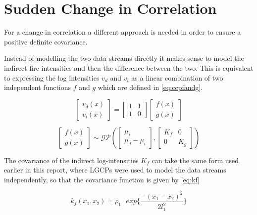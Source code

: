 \documentclass[a4paper,11pt]{report}
\begin{document}
\section{Sudden Change in Correlation}

For a change in correlation a different approach is needed in order to ensure a positive definite covariance.  

Instead of modelling the two data streams directly it makes sense to model the indirect fire intensities and then the difference between the two. This is equivalent to expressing the log intensities \(v_d\) and \(v_i\) as a linear combination of two independent functions \(f\) and \(g\) which are defined in \ref{eq:ccpfandg}.

\begin{equation} 
\left[ \begin{array}{cc}
v_{d}(x)  \\
v_{i}(x) \end{array} \right] = \left[ \begin{array}{cc}
1 & 1  \\
1  & 0 \end{array} \right] \left[ \begin{array}{cc}
f(x)  \\
g(x) \end{array} \right]
\end{equation}

\begin{equation} \label{eq:ccpfandg}
\left[ \begin{array}{cc}
f(x)  \\
g(x) \end{array} \right] \sim \mathcal{G}\mathcal{P} \left( \left[ \begin{array}{cc}
\mu_i  \\
\mu_d - \mu_i \end{array} \right], \left[ \begin{array}{cc}
K_f & 0  \\
0  & K_g \end{array} \right] \right)
\end{equation}

The covariance of the indirect log-intensities \(K_f\) can take the same form used earlier in this report, where LGCPs were used to model the data streams independently, so that the covariance function is given by \ref{eq:kf}

\begin{equation} \label{eq:kf}
k_f(x_1,x_2) = \rho_1 \text{ }exp\{\frac{-(x_1-x_2)^2}{2 l_1^2}\}
\end{equation}
\end{document}
